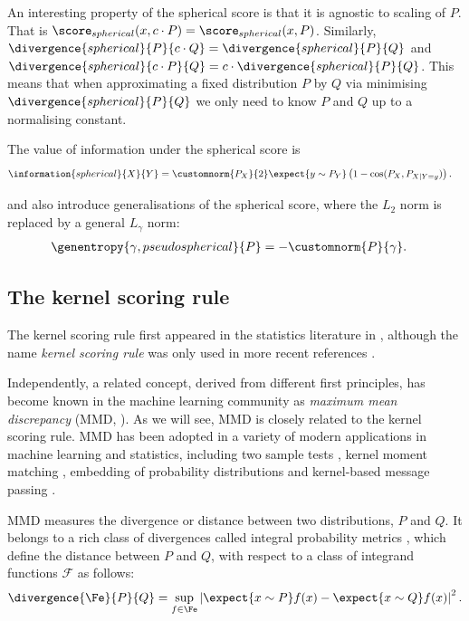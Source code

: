 An interesting property of the spherical score is that it is agnostic to scaling of $P$. That is $\score_{spherical}(x,c\cdot P) = \score_{spherical}(x,P) $. Similarly, $\divergence{spherical}{P}{c\cdot Q} = \divergence{spherical}{P}{Q}$ and $\divergence{spherical}{c\cdot P}{Q} = c \cdot \divergence{spherical}{P}{Q}$. This means that when approximating a fixed distribution $P$ by $Q$ via minimising $\divergence{spherical}{P}{Q}$ we only need to know $P$ and $Q$ up to a normalising constant.

The value of information under the spherical score is
%
\begin{align}
	\information{spherical}{X}{Y} &= \customnorm{P_X}{2}\expect{y \sim P_{Y}} \left( 1 - \cos(P_X,P_{X\vert Y=y}) \right).
\end{align}

\citet{Gneiting2007} and \citet{Jose2008} also introduce generalisations of the spherical score, where the $L_2$ norm is replaced by a general $L_\gamma$ norm:
%
\begin{align}
	\genentropy{\gamma,pseudospherical}{P} &= -\customnorm{P}{\gamma}.
\end{align}

\subsection{The kernel scoring rule\label{sec:kernel_score}}

The kernel scoring rule first appeared in the statistics literature in \citep{Eaton1996}, although the name \emph{kernel scoring rule} was only used in more recent references \citep{Dawid1994,Dawid2007,Gneiting2007}.

Independently, a related concept, derived from different first principles, has become known in the machine learning community as \emph{maximum mean discrepancy} (MMD, \citep{Sriperumbudur2008}). As we will see, MMD is closely related to the kernel scoring rule. MMD has been adopted in a variety of modern applications in machine learning and statistics, including two sample tests \citep{Gretton2012}, kernel moment matching \citep{Song2008}, embedding of probability distributions \citep{Smola2007} and kernel-based message passing \citep{Fukumizu2010}.

MMD measures the divergence or distance between two distributions, $P$ and $Q$. It belongs to a rich class of divergences called integral probability metrics \citep{Sriperumbudur2009}, which define the distance between  $P$ and $Q$, with respect to a class of integrand functions $\mathcal{F}$ as follows:
%
\begin{align}
	\divergence{\Fe}{P}{Q} = \sup_{f\in\Fe}\left\vert \expect{x\sim P} f(x) - \expect{x\sim Q} f(x) \right\vert^2.
\end{align}
	
